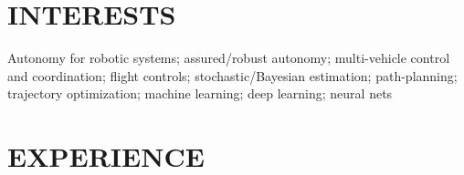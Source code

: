 \documentclass[margin]{resume} %
\begin{document}
\begin{resume} 

% 
%

 
\section{INTERESTS}  

Autonomy for robotic systems; assured/robust autonomy; multi-vehicle control and coordination; flight controls; stochastic/Bayesian estimation; path-planning; trajectory optimization; machine learning; deep learning; neural nets
 
 
\section{EXPERIENCE}


\end{resume}
\end{document}
